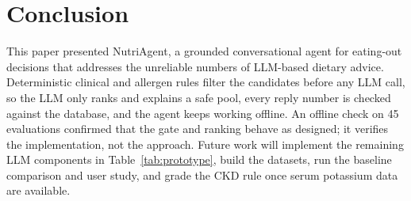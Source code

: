 \section{Conclusion}
\label{sec:conclusion}

This paper presented NutriAgent, a grounded conversational agent for eating-out
decisions that addresses the unreliable numbers of LLM-based dietary advice.
Deterministic clinical and allergen rules filter the candidates before any LLM
call, so the LLM only ranks and explains a safe pool, every reply number is
checked against the database, and the agent keeps working offline.
An offline check on 45 evaluations confirmed that the gate and ranking behave
as designed; it verifies the implementation, not the approach.
Future work will implement the remaining LLM components in
Table~\ref{tab:prototype}, build the datasets, run the baseline comparison and
user study, and grade the CKD rule once serum potassium data are available.
